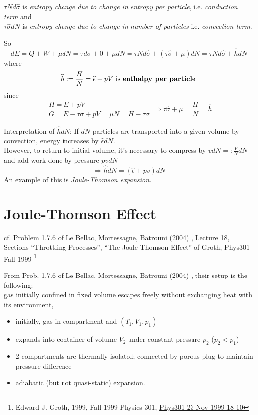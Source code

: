 \documentclass[10pt]{amsart}
\begin{document}
\begin{multicols*}{2}
$\tau N d\widehat{\sigma}$ is \emph{entropy change due to change in entropy per particle}, i.e. \emph{conduction term} and \\

$\tau \widehat{\sigma} dN$ is \emph{entropy change due to change in number of particles} i.e. \emph{ convection term}.  

So
\[
dE = Q + W + \mu dN = \tau d\sigma + 0 + \mu dN = \tau Nd\widehat{\sigma} + (\tau \widehat{\sigma} + \mu ) dN = \tau N d\widehat{\sigma} + \widehat{h} dN
\]
where
\[
\widehat{h} := \frac{H}{N} = \widehat{\epsilon} + pV \text{ is \textbf{enthalpy per particle} }
\]
since 
\[
\begin{gathered}
H = E + pV \\ 
G = E-\tau \sigma + pV = \mu N = H-\tau \sigma
\end{gathered} \Longrightarrow \tau \widehat{\sigma} + \mu = \frac{H}{N} = \widehat{h}
\]

Interpretation of $\widehat{h}dN$: If $dN$ particles are transported into a given volume by convection, energy increases by $\widehat{\epsilon}dN$.  \\
However, to return to initial volume, it's necessary to compress by $vdN =: \frac{V}{N}dN$ and add work done by pressure $pvdN$
\[
\Longrightarrow \widehat{h}dN = (\widehat{\epsilon} + pv)dN
\]
An example of this is \emph{Joule-Thomson expansion}.  

\section{Joule-Thomson Effect}

cf. Problem 1.7.6 of Le Bellac, Mortessagne, Batrouni (2004) \cite{MLeBellacFMortessagneGBatrouni2004}, Lecture 18, Sections ``Throttling Processes'', ``The Joule-Thomson Effect'' of Groth, Phys301 Fall 1999 \footnote{Edward J. Groth, 1999, Fall 1999 Physics 301, \href{http://grothserver.princeton.edu/~groth/phys301f99/lect18.pdf}{Phys301 23-Nov-1999 18-10} }

From Prob. 1.7.6 of Le Bellac, Mortessagne, Batrouni (2004) \cite{MLeBellacFMortessagneGBatrouni2004}, their setup is the following: \\
gas initially confined in fixed volume escapes freely without exchanging heat with its environment, 
\begin{itemize}
\item initially, gas in compartment and $(T_1,V_1,p_1)$ 
\item expands into container of volume $V_2$ under constant pressure $p_2$ ($p_2<p_1$)
\item 2 compartments are thermally isolated; connected by porous plug to maintain pressure difference
\item adiabatic (but not quasi-static) expansion.
\end{itemize}


\end{multicols*}
\end{document}
